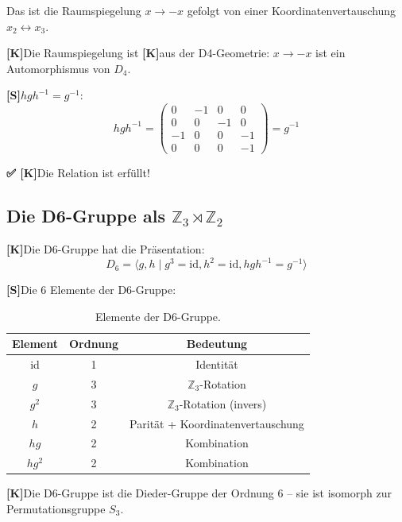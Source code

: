 \documentclass[11pt,a4paper]{article}
\newcommand{\Kstatus}{\textbf{[K]}}
\newcommand{\Sstatus}{\textbf{[S]}}
\newcommand{\Checkmark}{\textbf{✅ [K]}}
\begin{document}
	Das ist die Raumspiegelung $x \to -x$ gefolgt von einer Koordinatenvertauschung $x_2 \leftrightarrow x_3$.
	
	\Kstatus Die Raumspiegelung ist \Kstatus aus der D4-Geometrie: $x \to -x$ ist ein Automorphismus von $D_4$.
	
	\Sstatus $h g h^{-1} = g^{-1}$:
	\begin{equation}
		h g h^{-1} = \begin{pmatrix}
			0 & -1 & 0 & 0 \\
			0 & 0 & -1 & 0 \\
			-1 & 0 & 0 & -1 \\
			0 & 0 & 0 & -1
		\end{pmatrix} = g^{-1}
	\end{equation}
	
	\Checkmark Die Relation ist erfüllt!
	
	\subsection{Die D6-Gruppe als $\mathbb{Z}_3 \rtimes \mathbb{Z}_2$}
	
	\Kstatus Die D6-Gruppe hat die Präsentation:
	\begin{equation}
		D_6 = \langle g, h \mid g^3 = \text{id}, h^2 = \text{id}, h g h^{-1} = g^{-1} \rangle
	\end{equation}
	
	\Sstatus Die 6 Elemente der D6-Gruppe:
	
	\begin{table}[h!]
		\centering
		\caption{Elemente der D6-Gruppe.}
		\label{tab:d6_elements}
		\begin{tabular}{c c c}
			\toprule
			\textbf{Element} & \textbf{Ordnung} & \textbf{Bedeutung} \\
			\midrule
			id & 1 & Identität \\
			$g$ & 3 & $\mathbb{Z}_3$-Rotation \\
			$g^2$ & 3 & $\mathbb{Z}_3$-Rotation (invers) \\
			$h$ & 2 & Parität + Koordinatenvertauschung \\
			$hg$ & 2 & Kombination \\
			$hg^2$ & 2 & Kombination \\
			\bottomrule
		\end{tabular}
	\end{table}
	
	\Kstatus Die D6-Gruppe ist die Dieder-Gruppe der Ordnung 6 -- sie ist isomorph zur Permutationsgruppe $S_3$.
	
\end{document}
